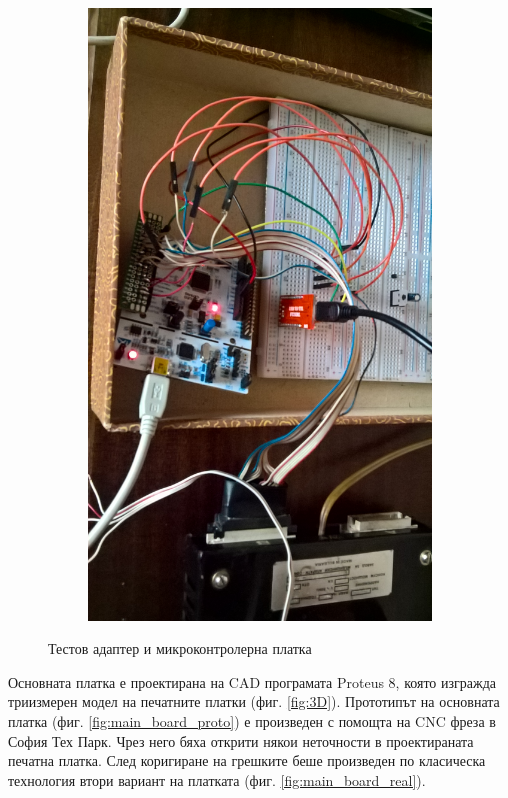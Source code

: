 \begin{figure}[!h]
\begin{subfigure}{0.48\textwidth}
        \includegraphics[width=\linewidth]{pictures/test_adapter_2.jpg}
    \end{subfigure}
    \caption{Тестов адаптер и микроконтролерна платка}
    \label{fig:test_adapter}
\end{figure}
\indent{}
Основната платка е проектирана на CAD програмата Proteus 8, която изгражда триизмерен модел на печатните платки (фиг. \ref{fig:3D}). Прототипът на основната платка (фиг. \ref{fig:main_board_proto}) е произведен с помощта на CNC фреза в София Тех Парк. Чрез него бяха открити някои неточности в проектираната печатна платка. След коригиране на грешките беше произведен по класическа технология втори вариант на платката (фиг. \ref{fig:main_board_real}).\\
